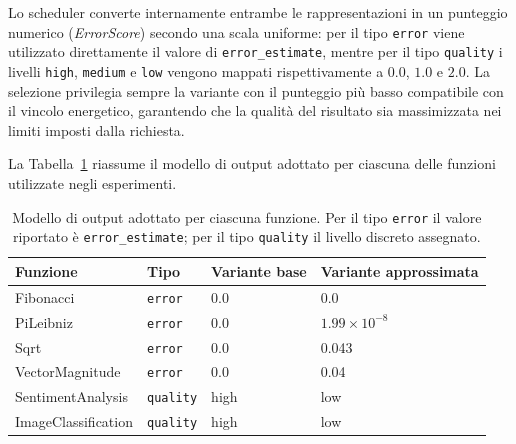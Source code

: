 Lo scheduler converte internamente entrambe le rappresentazioni in un 
punteggio numerico (\emph{ErrorScore}) secondo una scala uniforme: 
per il tipo \texttt{error} viene utilizzato direttamente il valore di 
\texttt{error\_estimate}, mentre per il tipo \texttt{quality} i livelli 
\texttt{high}, \texttt{medium} e \texttt{low} vengono mappati 
rispettivamente a $0.0$, $1.0$ e $2.0$. La selezione privilegia 
sempre la variante con il punteggio più basso compatibile con il 
vincolo energetico, garantendo che la qualità del risultato sia 
massimizzata nei limiti imposti dalla richiesta.

La Tabella~\ref{tab:output-models} riassume il modello di output 
adottato per ciascuna delle funzioni utilizzate negli esperimenti.

\begin{table}[h]
    \centering
    \begin{tabular}{llll}
        \toprule
        \textbf{Funzione} & \textbf{Tipo} & 
        \textbf{Variante base} & \textbf{Variante approssimata} \\
        \midrule
        Fibonacci         & \texttt{error}   & 0.0  & 0.0 \\
        PiLeibniz         & \texttt{error}   & 0.0  & $1.99 \times 10^{-8}$ \\
        Sqrt              & \texttt{error}   & 0.0  & 0.043 \\
        VectorMagnitude   & \texttt{error}   & 0.0  & 0.04 \\
        SentimentAnalysis & \texttt{quality} & high & low \\
        ImageClassification & \texttt{quality} & high & low \\
        \bottomrule
    \end{tabular}
    \caption{Modello di output adottato per ciascuna funzione. Per il 
    tipo \texttt{error} il valore riportato è \texttt{error\_estimate}; 
    per il tipo \texttt{quality} il livello discreto assegnato.}
    \label{tab:output-models}
\end{table}